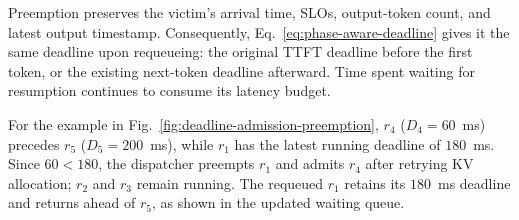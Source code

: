 Preemption preserves the victim's arrival time, SLOs, output-token count, and latest output timestamp.
Consequently, Eq.~\ref{eq:phase-aware-deadline} gives it the same deadline upon requeueing: the original TTFT deadline before the first token, or the existing next-token deadline afterward.
Time spent waiting for resumption continues to consume its latency budget.

For the example in Fig.~\ref{fig:deadline-admission-preemption}, $r_4$ ($D_4=60$~ms) precedes $r_5$ ($D_5=200$~ms), while $r_1$ has the latest running deadline of $180$~ms.
Since $60<180$, the dispatcher preempts $r_1$ and admits $r_4$ after retrying KV allocation; $r_2$ and $r_3$ remain running.
The requeued $r_1$ retains its $180$~ms deadline and returns ahead of $r_5$, as shown in the updated waiting queue.

